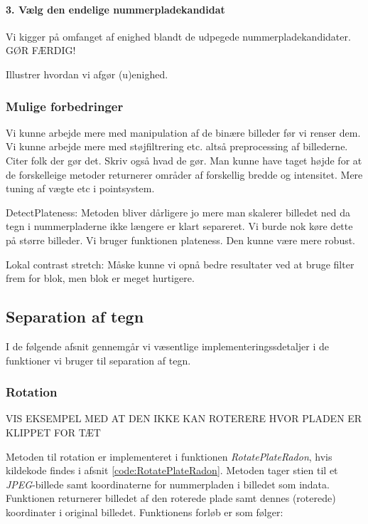 \paragraph{3. Vælg den endelige nummerpladekandidat}
Vi kigger på omfanget af enighed blandt de udpegede nummerpladekandidater. GØR FÆRDIG! 


  


Illustrer hvordan vi afgør (u)enighed. 

\subsubsection{Mulige forbedringer}
Vi kunne arbejde mere med manipulation af de binære billeder før vi renser dem. Vi kunne arbejde mere med støjfiltrering etc. altså preprocessing af billederne. Citer folk der gør det. Skriv også hvad de gør.
Man kunne have taget højde for at de forskelleige metoder returnerer områder af forskellig bredde og intensitet.
Mere tuning af vægte etc i pointsystem.

DetectPlateness:
Metoden bliver dårligere jo mere man skalerer billedet ned da tegn i nummerpladerne ikke længere er klart separeret. Vi burde nok køre dette på større billeder.
Vi bruger funktionen plateness. Den kunne være mere robust.

Lokal contrast stretch:
Måske kunne vi opnå bedre resultater ved at bruge filter frem for blok, men blok er meget hurtigere.



\subsection{Separation af tegn}

I de følgende afsnit gennemgår vi væsentlige implementeringssdetaljer i de funktioner vi bruger til separation af tegn. 

\subsubsection{Rotation}
\label{sec:implementation/sep/rotation}

VIS EKSEMPEL MED AT DEN IKKE KAN ROTERERE HVOR PLADEN ER KLIPPET FOR TÆT

Metoden til rotation er implementeret i funktionen \textit{RotatePlateRadon}, hvis kildekode findes i afsnit \vref{code:RotatePlateRadon}. Metoden tager stien til et \textit{JPEG}-billede samt koordinaterne for nummerpladen i billedet som indata. Funktionen returnerer billedet af den roterede plade samt dennes (roterede) koordinater i original billedet. Funktionens forløb er som følger:

